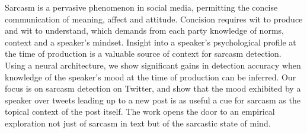 Sarcasm is a pervasive phenomenon in social media, permitting the concise communication of meaning, affect and attitude. Concision requires wit to produce and wit to understand, which demands from each party knowledge of norms, context and a speaker's mindset. Insight into a speaker's psychological profile at the time of production is a valuable source of context for sarcasm detection. Using a neural architecture, we show significant gains in detection accuracy when knowledge of the speaker's mood at the time of production can be inferred. Our focus is on sarcasm detection on Twitter, and show that the mood exhibited by a speaker over tweets leading up to a new post is as useful a cue for sarcasm as the topical context of the post itself. The work opens the door to an empirical exploration not just of sarcasm in text but of the sarcastic state of mind.
